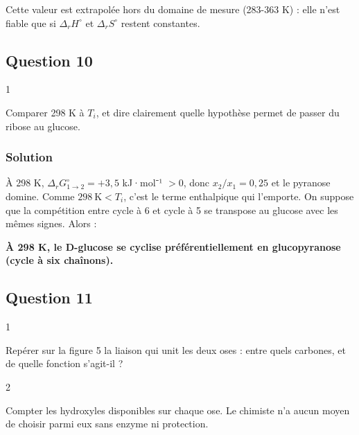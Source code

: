 \documentclass[11pt,a4paper]{article}
\newcommand{\equationajustee}[1]{%
  \sbox{\boiteequation}{$\displaystyle #1$}%
  \ifdim\wd\boiteequation>\linewidth
    \[\resizebox{\linewidth}{!}{\usebox{\boiteequation}}\]%
  \else
    \[#1\]%
  \fi}
\begin{document}
\equationajustee{\boxed{T_i\approx3{,}97\times10^2\ \mathrm K}}

Cette valeur est extrapolée hors du domaine de mesure (283-363 K) : elle n'est fiable que si \(\Delta_rH^\circ\) et \(\Delta_rS^\circ\) restent constantes.

\hypertarget{question-10}{%
\subsection{Question 10}\label{question-10}}

\begin{indication}{1}

Comparer 298 K à \(T_i\), et dire clairement quelle hypothèse permet de passer du ribose au glucose.

\end{indication}

\hypertarget{solution-9}{%
\subsubsection{Solution}\label{solution-9}}

À 298 K, \(\Delta_rG^\circ_{1\to2}=+3{,}5\) kJ·mol⁻¹ \(>0\), donc \(x_2/x_1=0{,}25\) et le pyranose domine. Comme \(298\ \mathrm K<T_i\), c'est le terme enthalpique qui l'emporte. On suppose que la compétition entre cycle à 6 et cycle à 5 se transpose au glucose avec les mêmes signes. Alors :

\textbf{À 298 K, le D-glucose se cyclise préférentiellement en glucopyranose (cycle à six chaînons).}

\hypertarget{question-11}{%
\subsection{Question 11}\label{question-11}}

\begin{indication}{1}

Repérer sur la figure 5 la liaison qui unit les deux oses : entre quels carbones, et de quelle fonction s'agit-il ?

\end{indication}

\begin{indication}{2}

Compter les hydroxyles disponibles sur chaque ose. Le chimiste n'a aucun moyen de choisir parmi eux sans enzyme ni protection.

\end{indication}
\end{document}

